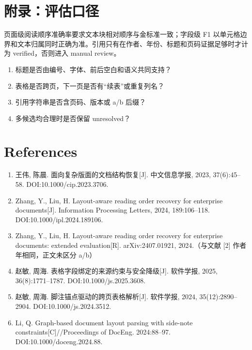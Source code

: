 \documentclass[11pt]{article}
\begin{document}
\section*{附录：评估口径}
页面级阅读顺序准确率要求文本块相对顺序与金标准一致；字段级 F1 以单元格边界和文本归属同时正确为准。引用只有在作者、年份、标题和页码证据足够时才计为 verified，否则进入 manual review。\par
\begin{enumerate}\item 标题是否由编号、字体、前后空白和语义共同支持？\item 表格是否跨页，下一页是否有“续表”或重复列名？\item 引用字符串是否含页码、版本或 a/b 后缀？\item 多候选均合理时是否保留 unresolved？\end{enumerate}
\section*{References}
{\small\sloppy\begin{enumerate}\setlength{\itemsep}{2pt}\item 王伟, 陈晨. 面向复杂版面的文档结构恢复[J]. 中文信息学报, 2023, 37(6):45--58. DOI:10.1000/cip.2023.3706.\item Zhang, Y., Liu, H. Layout-aware reading order recovery for enterprise documents[J]. Information Processing Letters, 2024, 189:106--118. DOI:10.1000/ipl.2024.189106.\item Zhang, Y., Liu, H. Layout-aware reading order recovery for enterprise documents: extended evaluation[R]. arXiv:2407.01921, 2024.（与文献 [2] 作者年相同，正文未区分 a/b）\item 赵敏, 周海. 表格字段绑定的来源约束与安全降级[J]. 软件学报, 2025, 36(8):1771--1787. DOI:10.1000/js.2025.3608.\item 赵敏, 周海. 脚注锚点驱动的跨页表格解析[J]. 软件学报, 2024, 35(12):2890--2904. DOI:10.1000/js.2024.3512.\item Li, Q. Graph-based document layout parsing with side-note constraints[C]//Proceedings of DocEng. 2024:88--97. DOI:10.1000/doceng.2024.88.\end{enumerate}}
\end{document}
